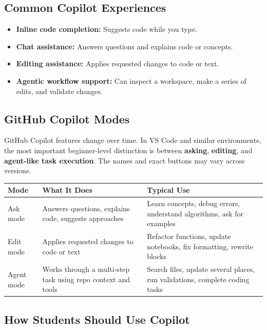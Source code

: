 \documentclass[11pt,a4paper]{article}
\begin{document}
\subsection{Common Copilot Experiences}

\begin{itemize}[leftmargin=*]
  \item \textbf{Inline code completion:} Suggests code while you type.
  \item \textbf{Chat assistance:} Answers questions and explains code or concepts.
  \item \textbf{Editing assistance:} Applies requested changes to code or text.
  \item \textbf{Agentic workflow support:} Can inspect a workspace, make a series of edits, and validate changes.
\end{itemize}

\subsection{GitHub Copilot Modes}

\begin{conceptbox}
GitHub Copilot features change over time. In VS Code and similar environments, the most important beginner-level distinction is between \textbf{asking}, \textbf{editing}, and \textbf{agent-like task execution}. The names and exact buttons may vary across versions.
\end{conceptbox}

\begin{longtable}{@{}p{2.7cm}p{3.8cm}p{5.9cm}@{}}
\toprule
\rowcolor{primary!15}
\textbf{Mode} & \textbf{What It Does} & \textbf{Typical Use} \\
\midrule
\endhead
Ask mode & Answers questions, explains code, suggests approaches & Learn concepts, debug errors, understand algorithms, ask for examples \\
\addlinespace
Edit mode & Applies requested changes to code or text & Refactor functions, update notebooks, fix formatting, rewrite blocks \\
\addlinespace
Agent mode & Works through a multi-step task using repo context and tools & Search files, update several places, run validations, complete coding tasks \\
\bottomrule
\end{longtable}

\subsection{How Students Should Use Copilot}
\end{document}
